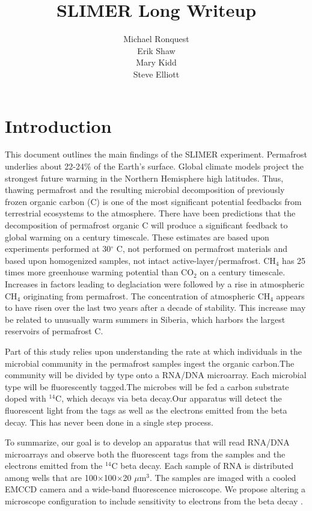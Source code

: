 \documentclass[11pt]{amsart}
\title{SLIMER Long Writeup}
\author{Michael Ronquest \\
Erik Shaw \\
Mary Kidd\\
Steve Elliott}
\begin{document}
\maketitle
\section{Introduction}
This document outlines the main findings of the SLIMER experiment.  Permafrost underlies about 22-24\% of the Earth's surface.  Global climate models project the strongest future warming in the Northern Hemisphere high latitudes.  Thus, thawing permafrost and the resulting microbial decomposition of previously frozen organic carbon (C) is one of the most significant potential feedbacks from terrestrial ecosystems to the atmosphere.   There have been predictions that the decomposition of permafrost organic C will produce a significant feedback to global warming on a century timescale.  These estimates are based upon experiments performed at 30$^\circ$ C, not performed on permafrost materials and based upon homogenized samples, not intact active-layer/permafrost.  CH$_4$ has 25 times more greenhouse warming potential than CO$_2$ on a century timescale.  Increases in factors leading to deglaciation were followed by a rise in atmospheric CH$_4$ originating from  permafrost.  The concentration of atmospheric CH$_4$ appears to have risen over the last two years after a decade of stability. This increase may be related to unusually warm summers in Siberia, which harbors the largest reservoirs of permafrost C. 

Part of this study relies upon understanding the rate at which individuals in the microbial community in the permafrost samples ingest the organic carbon.The community will be divided by type onto a RNA/DNA microarray.  Each microbial type will be fluorescently tagged.The microbes will be fed a carbon substrate doped with $^{14}$C, which decays via beta decay.Our apparatus will detect the fluorescent light from the tags as well as the electrons emitted from the beta decay.  This has never been done in a single step process.

To summarize, our goal is to develop an apparatus that will read RNA/DNA microarrays and observe both the fluorescent tags from the samples and the electrons emitted from the $^{14}$C beta decay.  Each sample of RNA is distributed among wells that are 100$\times$100$\times$20 $\mu$m$^3$.  The samples are imaged with a cooled EMCCD camera and a wide-band fluorescence microscope.  We propose altering a microscope configuration to include sensitivity to electrons from the beta decay .  
\end{document}
